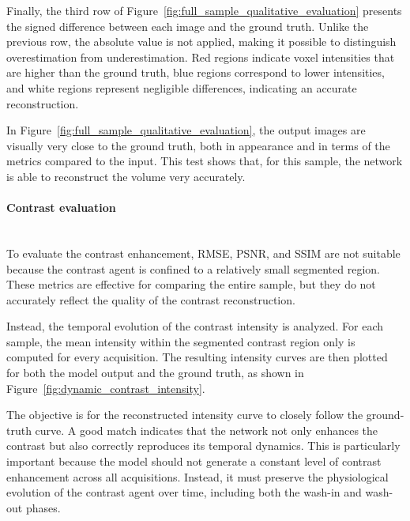 \documentclass[12pt]{article}
\begin{document}
Finally, the third row of Figure~\ref{fig:full_sample_qualitative_evaluation} presents the signed difference between each image and the ground truth.
Unlike the previous row, the absolute value is not applied, making it possible to distinguish overestimation from underestimation. 
Red regions indicate voxel intensities that are higher than the ground truth, blue regions correspond to lower intensities, and white regions represent negligible differences, indicating an accurate reconstruction.
\vspace{0.5cm}

In Figure~\ref{fig:full_sample_qualitative_evaluation}, the output images are visually very close to the ground truth, both in appearance and in terms of the metrics compared to the input.
This test shows that, for this sample, the network is able to reconstruct the volume very accurately.

\paragraph{Contrast evaluation}
\mbox{}\\

To evaluate the contrast enhancement, RMSE, PSNR, and SSIM are not suitable because the contrast agent is confined to a relatively small segmented region. 
These metrics are effective for comparing the entire sample, but they do not accurately reflect the quality of the contrast reconstruction.
\vspace{0.5cm}

Instead, the temporal evolution of the contrast intensity is analyzed.
For each sample, the mean intensity within the segmented contrast region only is computed for every acquisition.
The resulting intensity curves are then plotted for both the model output and the ground truth, as shown in Figure~\ref{fig:dynamic_contrast_intensity}.
\vspace{0.5cm}

The objective is for the reconstructed intensity curve to closely follow the ground-truth curve. 
A good match indicates that the network not only enhances the contrast but also correctly reproduces its temporal dynamics. 
This is particularly important because the model should not generate a constant level of contrast enhancement across all acquisitions. 
Instead, it must preserve the physiological evolution of the contrast agent over time, including both the wash-in and wash-out phases.
\vspace{0.5cm}
\end{document}
